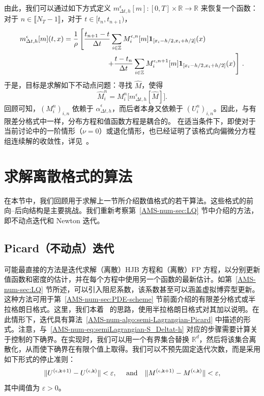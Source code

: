 \documentclass{amsproc}
\theoremstyle{definition}
\theoremstyle{remark}
\numberwithin{equation}{section}
\newcommand{\RR}{{\mathbb R}}
\newcommand{\ZZ}{{\mathbb Z}}
\newcommand{\ctrl}{\alpha}
\newcommand{\indic}{\mathbf{1}}
\begin{document}
由此，我们可以通过如下方式定义 $m^{\epsilon}_{\Delta t, h}[m]: [0,T] \times \RR \to \RR$ 来恢复一个函数：对于 $n \in \llbracket N_T-1 \rrbracket$，对于 $t \in [t_n, t_{n+1})$，
\begin{align}
	\label{AMS-num-eq:m-epsilon-Deltat-h}
	m^{\epsilon}_{\Delta t, h}[m](t,x) 
	&= \frac{1}{\rho} \left[ \frac{t_{n+1}-t}{\Delta t} \sum_{i \in \ZZ} M^{\epsilon, n}_{i}[m] \indic_{[x_i - h/2, x_i+h/2]}(x)  \right.
	\\
	&\qquad\qquad\qquad 
	\left. + \frac{t-t_{n}}{\Delta t} \sum_{i \in \ZZ} M^{\epsilon,n+1}_{i}[m] \indic_{[x_i - h/2, x_i+h/2]}(x) \right] \, .
	\notag
\end{align}
于是，目标是求解如下不动点问题：寻找 $\hat M$，使得
$$
	\hat M^{n}_i = M^n_i\big[m^{\epsilon}_{\Delta t, h}[\hat M]\big].
$$
回顾可知，$(M^n_i)_{i,n}$ 依赖于 $\hat \ctrl^{\epsilon}_{\Delta t, h}$，而后者本身又依赖于 $(U^n_i)_{i,n}$。因此，与有限差分格式中一样，分布方程和值函数方程是耦合的。
在适当条件下，即使对于当前讨论中的一阶情形（$\nu=0$）或退化情形，也已经证明了该格式向偏微分方程组连续解的收敛性，详见~\cite{MR3148086,MR3392626,MR3828859}。








\clearpage

\section{\bf 求解离散格式的算法}
\label{AMS-num-sec:sol-strat}

在本节中，我们回顾用于求解上一节所介绍数值格式的若干算法。这些格式的前向--后向结构是主要挑战。我们重新考察第~\ref{AMS-num-sec:LQ} 节中介绍的方法，即不动点迭代和 Newton 迭代。



\subsection{Picard（不动点）迭代}


可能最直接的方法是迭代求解（离散）HJB 方程和（离散）FP 方程，以分别更新值函数和密度的估计，并在每个方程中使用另一个函数的最新估计。如第~\ref{AMS-num-sec:LQ} 节所述，可以引入阻尼系数，该系数甚至可以涵盖虚拟博弈型更新。
这种方法可用于第~\ref{AMS-num-sec:PDE-scheme} 节前面介绍的有限差分格式或半拉格朗日格式。这里，我们本着~\cite{MR3148086} 的思路，使用半拉格朗日格式对其加以说明。在此情形下，迭代具有算法~\ref{AMS-num-algo:semi-Lagrangian-Picard} 中描述的形式。注意，与~\eqref{AMS-num-eq:semiLagrangian-S_Deltat-h} 对应的步骤需要计算关于控制的下确界。在实现时，我们可以用一个有界集合替换 $\RR^d$，然后将该集合离散化，从而使下确界在有限个值上取得。我们可以不预先固定迭代次数，而是采用如下形式的停止准则：
$$
	\|U^{(\epsilon, \mathtt{k}+1)} - U^{(\epsilon, \mathtt{k})}\| < \varepsilon, \quad \hbox{ and}  \quad \|M^{(\epsilon, \mathtt{k}+1)} - M^{(\epsilon, \mathtt{k})}\| < \varepsilon,
$$
其中阈值为 $\varepsilon>0$。
\end{document}
